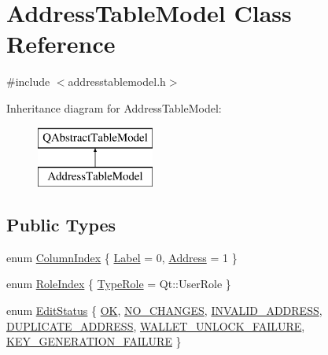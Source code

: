 \hypertarget{class_address_table_model}{}\section{Address\+Table\+Model Class Reference}
\label{class_address_table_model}


{\ttfamily \#include $<$addresstablemodel.\+h$>$}

Inheritance diagram for Address\+Table\+Model\+:\begin{figure}[H]
\begin{center}
\leavevmode
\includegraphics[height=2.000000cm]{class_address_table_model}
\end{center}
\end{figure}
\subsection*{Public Types}
\begin{DoxyCompactItemize}
\item 
enum \mbox{\hyperlink{class_address_table_model_a432276ac4504e926466072561c5ddb33}{Column\+Index}} \{ \mbox{\hyperlink{class_address_table_model_a432276ac4504e926466072561c5ddb33aaf8f25cebb70b8a394d6c0f23c941a32}{Label}} = 0, 
\mbox{\hyperlink{class_address_table_model_a432276ac4504e926466072561c5ddb33a8e0abf98768fd0897965974d51a825da}{Address}} = 1
 \}
\item 
enum \mbox{\hyperlink{class_address_table_model_a083a01bdd3351555760f203c78c992d7}{Role\+Index}} \{ \mbox{\hyperlink{class_address_table_model_a083a01bdd3351555760f203c78c992d7ab65a2b297bf0f2b7e3786e2e1d2b84af}{Type\+Role}} = Qt\+:\+:User\+Role
 \}
\item 
enum \mbox{\hyperlink{class_address_table_model_a3d502b85fc09461e779dae4589c29956}{Edit\+Status}} \{ \newline
\mbox{\hyperlink{class_address_table_model_a3d502b85fc09461e779dae4589c29956af4012fcd28039528046c825a7370ad95}{OK}}, 
\mbox{\hyperlink{class_address_table_model_a3d502b85fc09461e779dae4589c29956a236bb34532175071bf068f4c614f724c}{N\+O\+\_\+\+C\+H\+A\+N\+G\+ES}}, 
\mbox{\hyperlink{class_address_table_model_a3d502b85fc09461e779dae4589c29956a7e1e745ad0209b0cd8dd5866a7615021}{I\+N\+V\+A\+L\+I\+D\+\_\+\+A\+D\+D\+R\+E\+SS}}, 
\mbox{\hyperlink{class_address_table_model_a3d502b85fc09461e779dae4589c29956af9cc220dea0573d7819eebfa84c1691f}{D\+U\+P\+L\+I\+C\+A\+T\+E\+\_\+\+A\+D\+D\+R\+E\+SS}}, 
\newline
\mbox{\hyperlink{class_address_table_model_a3d502b85fc09461e779dae4589c29956a164544f37fe7cfbf17283015eca6fdb3}{W\+A\+L\+L\+E\+T\+\_\+\+U\+N\+L\+O\+C\+K\+\_\+\+F\+A\+I\+L\+U\+RE}}, 
\mbox{\hyperlink{class_address_table_model_a3d502b85fc09461e779dae4589c29956a9e181f9108c727771403c11c6a9a62dd}{K\+E\+Y\+\_\+\+G\+E\+N\+E\+R\+A\+T\+I\+O\+N\+\_\+\+F\+A\+I\+L\+U\+RE}}
 \}
\end{DoxyCompactItemize}
